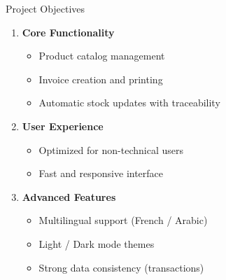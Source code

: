 \documentclass[aspectratio=169,11pt]{beamer}
\begin{document}
\begin{frame}{Project Objectives}

\begin{enumerate}
  \item[\textcolor{accent1}{\textbf{1.}}] \textbf{Core Functionality}
  \begin{itemize}
    \item Product catalog management
    \item Invoice creation and printing
    \item Automatic stock updates with traceability
  \end{itemize}
  
  \vspace{0.3cm}
  
  \item[\textcolor{accent1}{\textbf{2.}}] \textbf{User Experience}
  \begin{itemize}
    \item Optimized for \alert{non-technical users}
    \item Fast and responsive interface
  \end{itemize}
  
  \vspace{0.3cm}
  
  \item[\textcolor{accent1}{\textbf{3.}}] \textbf{Advanced Features}
  \begin{itemize}
    \item Multilingual support (French / Arabic)
    \item Light / Dark mode themes
    \item Strong data consistency (transactions)
  \end{itemize}
\end{enumerate}

\end{frame}
\end{document}
